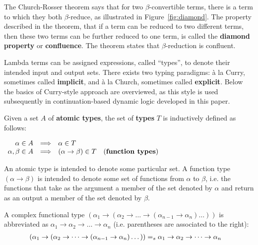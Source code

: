 The Church-Rosser theorem says that for two $\beta$-convertible terms, there is a term to which they both $\beta$-reduce, as illustrated in Figure~\ref{fig:diamond}. The property described in the theorem, that if a term can be reduced to two different terms, then these two terms can be further reduced to one term, is called the \textbf{diamond property} or \textbf{confluence}. The theorem states that $\beta$-reduction is confluent.

Lambda terms can be assigned expressions, called ``types'', to denote their intended input and output sets. There exists two typing paradigms: 
\`{a} la Curry, sometimes called \textbf{implicit}, and \`{a} la Church, sometimes called \textbf{explicit}. Below the basics of Curry-style approach are overviewed, as this style is used subsequently in continuation-based dynamic logic developed in this paper.


\begin{definition} Given a set $A$ of \textbf{atomic types}, the set of \textbf{types} $T$ is inductively defined as follows:
\begin{center}
$
\begin{array}{rcll}
\alpha \in A & \Longrightarrow & \alpha \in T &\\
\alpha, \beta \in A &  \Longrightarrow & (\alpha \rightarrow \beta) \in T & \text{(\textbf{function types})}
\end{array} 
$
\end{center}
\end{definition}
An atomic type is intended to denote some particular set. A function type $(\alpha \rightarrow \beta)$ is intended to denote some set of functions from $\alpha$ to $\beta$, i.e. the functions that take as the argument a member of the set denoted by $\alpha$ and return as an output a member of the set denoted by $\beta$.


\begin{remark} A complex functional type $(\alpha_1 \rightarrow (\alpha_2 \rightarrow \dots \rightarrow (\alpha_{n-1} \rightarrow \alpha_n)  \dots ))$ is abbreviated as $\alpha_1 \rightarrow \alpha_2 \rightarrow \dots \rightarrow \alpha_n$ (i.e. parentheses are associated to the right):
\begin{align*}
(\alpha_1 \rightarrow (\alpha_2 \rightarrow \dots \rightarrow (\alpha_{n-1} \rightarrow \alpha_n)  \dots )) & =_s \alpha_1 \rightarrow \alpha_2 \rightarrow \dots \rightarrow \alpha_n
\end{align*}
\end{remark}


